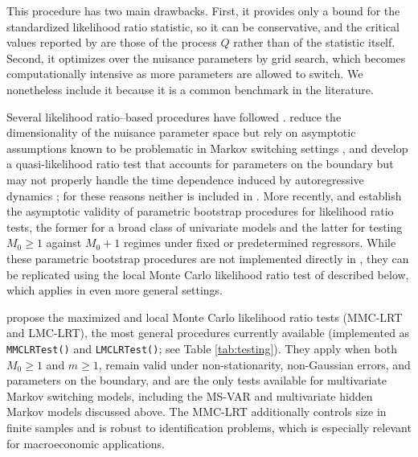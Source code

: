 This procedure has two main drawbacks. First, it provides only a bound for the standardized likelihood ratio statistic, so it can be conservative, and the critical values reported by  are those of the process \(Q\) rather than of the statistic itself. Second, it optimizes over the nuisance parameters by grid search, which becomes computationally intensive as more parameters are allowed to switch. We nonetheless include it because it is a common benchmark in the literature.

Several likelihood ratio--based procedures have followed \citet{hansen92}. \citet{garcia98} reduce the dimensionality of the nuisance parameter space but rely on asymptotic assumptions known to be problematic in Markov switching settings \citep{hansen96inference, andrewsploberger94}, and \citet{chowhite07} develop a quasi-likelihood ratio test that accounts for parameters on the boundary but may not properly handle the time dependence induced by autoregressive dynamics \citep{carsteig2012, chowhi2011}; for these reasons neither is included in . More recently, \citet{quzhuo2021likelihood} and \citet{kasshi2018} establish the asymptotic validity of parametric bootstrap procedures for likelihood ratio tests, the former for a broad class of univariate models and the latter for testing \(M_0 \geq 1\) against \(M_0 + 1\) regimes under fixed or predetermined regressors. While these parametric bootstrap procedures are not implemented directly in , they can be replicated using the local Monte Carlo likelihood ratio test of \citet{rodrondufour_mcmstest} described below, which applies in even more general settings.

\citet{rodrondufour_mcmstest} propose the maximized and local Monte Carlo likelihood ratio tests (MMC-LRT and LMC-LRT), the most general procedures currently available (implemented as \texttt{MMCLRTest()} and \texttt{LMCLRTest()}; see Table \ref{tab:testing}). They apply when both \(M_0 \ge 1\) and \(m \ge 1\), remain valid under non-stationarity, non-Gaussian errors, and parameters on the boundary, and are the only tests available for multivariate Markov switching models, including the MS-VAR and multivariate hidden Markov models discussed above. The MMC-LRT additionally controls size in finite samples and is robust to identification problems, which is especially relevant for macroeconomic applications.

